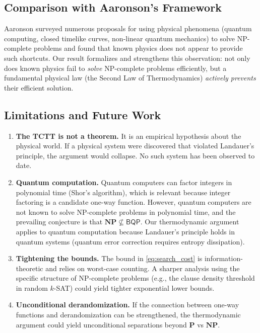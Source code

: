 \documentclass[12pt, a4paper]{article}
\newcommand{\Pc}{\mathbf{P}}
\newcommand{\NPc}{\mathbf{NP}}
\theoremstyle{plain}
\theoremstyle{definition}
\theoremstyle{remark}
\begin{document}
\subsection{Comparison with Aaronson's Framework}

Aaronson \citep{Aaronson2005} surveyed numerous proposals for using
physical phenomena (quantum computing, closed timelike curves, non-linear
quantum mechanics) to solve NP-complete problems and found that known
physics does not appear to provide such shortcuts. Our result formalizes
and strengthens this observation: not only does known physics fail to
\emph{solve} NP-complete problems efficiently, but a fundamental physical
law (the Second Law of Thermodynamics) \emph{actively prevents} their
efficient solution.

\subsection{Limitations and Future Work}

\begin{enumerate}
  \item \textbf{The TCTT is not a theorem.} It is an empirical hypothesis
    about the physical world. If a physical system were discovered that
    violated Landauer's principle, the argument would collapse. No such
    system has been observed to date.

  \item \textbf{Quantum computation.} Quantum computers can factor integers
    in polynomial time (Shor's algorithm), which is relevant because
    integer factoring is a candidate one-way function. However, quantum
    computers are not known to solve NP-complete problems in polynomial
    time, and the prevailing conjecture is that $\NPc \not\subseteq
    \mathsf{BQP}$. Our thermodynamic argument applies to quantum
    computation because Landauer's principle holds in quantum systems
    (quantum error correction requires entropy dissipation).

  \item \textbf{Tightening the bounds.} The bound in
    \eqref{eq:search_cost} is information-theoretic and relies on
    worst-case counting. A sharper analysis using the specific structure
    of NP-complete problems (e.g., the clause density threshold in random
    $k$-SAT) could yield tighter exponential lower bounds.

  \item \textbf{Unconditional derandomization.} If the connection
    between one-way functions and derandomization
    \citep{ImpagliazzoWigderson1997} can be strengthened, the
    thermodynamic argument could yield unconditional separations beyond
    $\Pc$ vs $\NPc$.
\end{enumerate}
\end{document}
